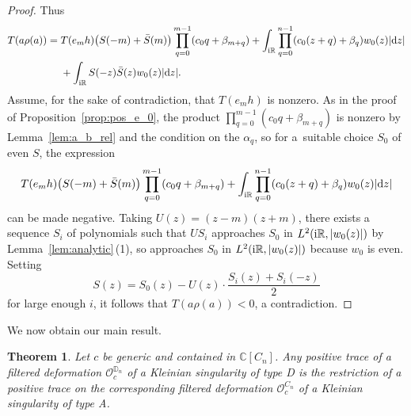 \documentclass[pdftex]{sigma}
\newcommand\RR{\mathbb{R}}
\newcommand\CC{\mathbb{C}}
\newcommand\DD{\mathbb{D}}
\newcommand\cO{\mathcal{O}}
\renewcommand\d{\mathrm{d}}
\renewcommand\S{\bar{S}}
\numberwithin{equation}{section}
\newtheorem{Theorem}{Theorem}[section]
\theoremstyle{definition}
\begin{document}
\begin{proof}
 Thus
 \begin{align*}
 T(a \rho(a)) ={}& T(e_m h) \bigl(S(-m ) + \S(m)\bigr)
 \prod\limits_{q = 0}^{m - 1} (c_0 q + \beta_{m + q}) + \int_{{\rm i}\RR} \prod\limits_{q = 0}^{n - 1}
 (c_0 (z + q) + \beta_q) w_0 (z) |\d z| \\
 & + \int_{{\rm i}\RR} S(-z) \S(z) w_0 (z) |\d z|.
 \end{align*}
 Assume, for the sake of contradiction, that $T(e_m h)$
 is nonzero.
 As in the proof of Proposition~\ref{prop:pos_e_0},
 the product $\prod_{q = 0}^{m - 1} (c_0 q + \beta_{m + q})$
 is nonzero by Lemma~\ref{lem:a_b_rel}
 and the condition on the $\alpha_q$,
 so for a~suitable choice $S_0$ of even $S$,
 the expression
 \begin{equation*}
 T(e_m h) \bigl(S(-m ) + \S(m)\bigr)
 \prod\limits_{q = 0}^{m - 1} (c_0 q + \beta_{m + q})
 + \int_{{\rm i}\RR} \prod\limits_{q = 0}^{n - 1}
 (c_0 (z + q) + \beta_q) w_0 (z) |\d z|
 \end{equation*}
 can be made negative.
 Taking $U(z) = (z - m)(z + m)$,
 there exists a sequence $S_i$ of polynomials
 such that $US_i$ approaches $S_0$ in
 $L^2 ({\rm i}\RR, |w_0 (z)|)$
 by Lemma~\ref{lem:analytic}\,(1),
 so 
 approaches $S_0$ in $L^2 ({\rm i}\RR, |w_0 (z)|)$
 because $w_0$ is even.
 Setting
 \[
 S(z) = S_0(z) - U(z) \cdot \frac{S_i(z) + S_i(-z)}{2}
 \]
 for large enough $i$,
 it follows that $T(a \rho(a)) < 0$, a contradiction.
\end{proof}

We now obtain our main result.

\begin{Theorem}
 \label{thm:pos_trace}
 Let $c$ be generic and contained in $\CC[C_n]$.
 Any positive trace of a filtered deformation $\cO_c^{\DD_n}$
 of a Kleinian singularity of type D
 is the restriction of a positive trace
 on the corresponding filtered deformation $\cO_c^{C_n}$
 of a Kleinian singularity of type A.
\end{Theorem}
\end{document}
